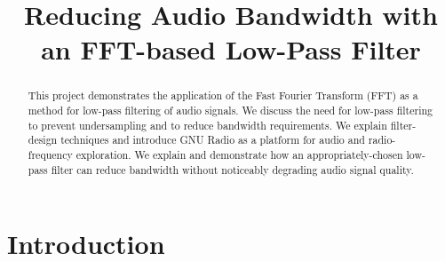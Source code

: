 
\usepackage{graphicx} %
\usepackage{hyperref}
\usepackage{amsmath}
\usepackage{float} 
\usepackage{listings} %

 

\title{Reducing Audio Bandwidth with an FFT-based Low-Pass Filter}

\author{
    \and
    \and
}

\maketitle

\begin{abstract}

    This project demonstrates the application of the Fast Fourier
    Transform (FFT) as a method for low-pass filtering of audio
    signals. We discuss the need for low-pass filtering to
    prevent undersampling and to reduce bandwidth requirements.
    We explain filter-design techniques and introduce GNU Radio
    as a platform for audio and radio-frequency exploration.  We
    explain and demonstrate how an appropriately-chosen low-pass filter
    can reduce bandwidth without noticeably degrading audio signal quality.

\end{abstract}

\IEEEpeerreviewmaketitle

\section{Introduction} 

